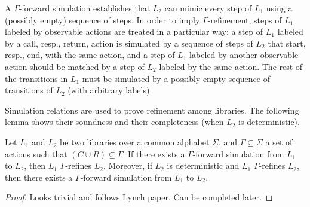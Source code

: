 A $\Gamma$-forward simulation establishes that $L_2$ can mimic every step of $L_1$ using a (possibly empty) sequence of steps. In order to imply $\Gamma$-refinement, steps of $L_1$ labeled by observable actions are treated in a particular way: a step of $L_1$ labeled by a call, resp., return, action is simulated by a sequence of steps of $L_2$ that start, resp., end, with the same action, and a step of $L_1$ labeled by another observable action should be matched by a step of $L_2$ labeled by the same action. The rest of the transitions in $L_1$ must be simulated by a possibly empty sequence of transitions of $L_2$ (with arbitrary labels).

Simulation relations are used to prove refinement among libraries. The following lemma shows their soundness and their completeness (when $L_2$ is deterministic).
\begin{lem}
Let $L_1$ and $L_2$ be two libraries over a common alphabet $\Sigma$, and $\Gamma\subseteq \Sigma$ a set of actions such that $(C\cup R)\subseteq \Gamma$. If there exists a $\Gamma$-forward simulation from $L_1$ to $L_2$, then $L_1$ $\Gamma$-refines $L_2$. Moreover, if $L_2$ is deterministic and $L_1$ $\Gamma$-refines $L_2$, then there exists a $\Gamma$-forward simulation from $L_1$ to $L_2$.
\end{lem}
\begin{proof}
Looks trivial and follows Lynch paper. Can be completed later.
\end{proof}



